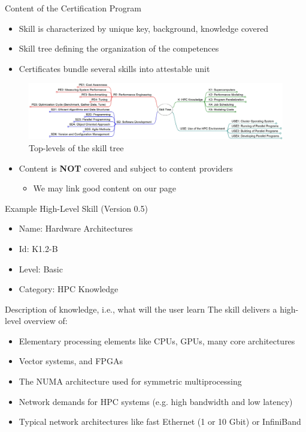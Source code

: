 \documentclass[compress,aspectratio=169]{beamer}
\begin{document}
\begin{frame}{Content of the Certification Program}
	\begin{itemize}
		\item Skill is characterized by unique key, background, knowledge covered
		\item Skill tree defining the organization of the competences
		\item Certificates bundle several skills into attestable unit
	\end{itemize}

		\begin{figure}
			\includegraphics[width=\textwidth]{skill-tree_top_levels}
			\caption{Top-levels of the skill tree}
		\end{figure}

	\begin{itemize}
		\item Content is \textbf{NOT} covered and subject to content providers
		\begin{itemize}
			\item We may link good content on our page
		\end{itemize}
	\end{itemize}
\end{frame}


\begin{frame}{Example High-Level Skill (Version 0.5)}

	\begin{itemize}
		\item Name: Hardware Architectures
		\item Id: K1.2-B
		\item Level: Basic
		\item Category: HPC Knowledge
	\end{itemize}

	\begin{block}{Description of knowledge, i.e., what will the user learn}
		The skill delivers a high-level overview of:
		\begin{itemize}
			\item Elementary processing elements like CPUs, GPUs, many core architectures
			\item Vector systems, and FPGAs
			\item The NUMA architecture used for symmetric multiprocessing
			\item Network demands for HPC systems (e.g. high bandwidth and low latency)
			\item Typical network architectures like fast Ethernet (1 or 10 Gbit) or InfiniBand
		\end{itemize}
	\end{block}
\end{frame}
\end{document}
